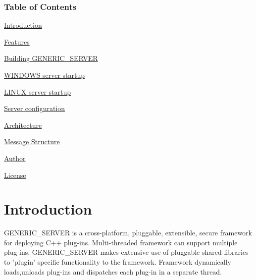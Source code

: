 \subsubsection*{Table of Contents}

\hyperlink{index_IN}{Introduction} \par
 \hyperlink{index_FE}{Features} \par
 \hyperlink{index_MK}{Building G\-E\-N\-E\-R\-I\-C\-\_\-\-S\-E\-R\-V\-E\-R} \par
 \hyperlink{index_WI}{W\-I\-N\-D\-O\-W\-S server startup} \par
 \hyperlink{index_LI}{L\-I\-N\-U\-X server startup} \par
 \hyperlink{index_SE}{Server configuration} \par
 \hyperlink{index_AR}{Architecture} \par
 \hyperlink{index_mp}{Message Structure} \par
 \hyperlink{index_au}{Author} \par
 \hyperlink{index_li}{License} \par
\hypertarget{index_IN}{}\section{Introduction}\label{index_IN}
G\-E\-N\-E\-R\-I\-C\-\_\-\-S\-E\-R\-V\-E\-R is a cross-\/platform, pluggable, extensible, secure framework for deploying C++ plug-\/ins. Multi-\/threaded framework can support multiple plug-\/ins. G\-E\-N\-E\-R\-I\-C\-\_\-\-S\-E\-R\-V\-E\-R makes extensive use of pluggable shared libraries to 'plugin' specific functionality to the framework. Framework dynamically loads,unloads plug-\/ins and dispatches each plug-\/in in a separate thread.

